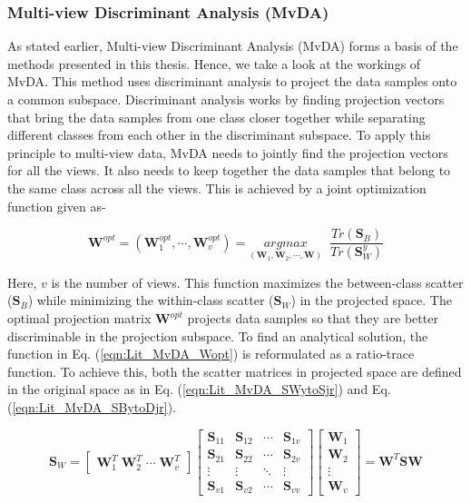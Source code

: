 \subsubsection{Multi-view Discriminant Analysis (MvDA)}
\label{ssubs:Lit_MvDA}
As stated earlier, Multi-view Discriminant Analysis (MvDA) \cite{KanSZLC16} forms a basis of the methods presented in this thesis. Hence, we take a look at the workings of MvDA. This method uses discriminant analysis to project the data samples onto a common subspace. Discriminant analysis works by finding projection vectors that bring the data samples from one class closer together while separating different classes from each other in the discriminant subspace. To apply this principle to multi-view data, MvDA needs to jointly find the projection vectors for all the views. It also needs to keep together the data samples that belong to the same class across all the views. This is achieved by a joint optimization function given as-

\begin{equation}
\label{eqn:Lit_MvDA_Wopt}
\textbf{W}^{opt} = \left ( \textbf{W}_1^{opt},\cdots,\textbf{W}_v^{opt} \right ) = \underset{\left ( \textbf{W}_1, \textbf{W}_2,\cdots,\textbf{W} \right )}{argmax}\;\;\frac{Tr\left ( \textbf{S}_B \right )}{Tr\left (\textbf{S}_W^y \right )}
\end{equation}

Here, $v$ is the number of views. This function maximizes the between-class scatter ($\textbf{S}_B$) while minimizing the within-class scatter ($\textbf{S}_W$) in the projected space. The optimal projection matrix $\textbf{W}^{opt}$ projects data samples so that they are better discriminable in the projection subspace. To find an analytical solution, the function in Eq. (\ref{eqn:Lit_MvDA_Wopt}) is reformulated as a ratio-trace function. To achieve this, both the scatter matrices in projected space are defined in the original space as in Eq. (\ref{eqn:Lit_MvDA_SWytoSjr}) and Eq. (\ref{eqn:Lit_MvDA_SBytoDjr}).

\begin{equation}
\label{eqn:Lit_MvDA_SWytoSjr}
\textbf{S}_W = \begin{bmatrix}
\textbf{W}_1^T \; \textbf{W}_2^T \; \cdots \; \textbf{W}_v^T
\end{bmatrix} 
\begin{bmatrix}
\textbf{S}_{11} & \textbf{S}_{12} & \cdots & \textbf{S}_{1v}\\ 
\textbf{S}_{21} & \textbf{S}_{22} & \cdots & \textbf{S}_{2v}\\
\vdots & \vdots & \ddots & \vdots\\ 
\textbf{S}_{v1} & \textbf{S}_{v2} & \cdots & \textbf{S}_{vv} 
\end{bmatrix}
\begin{bmatrix}
\textbf{W}_1\\ 
\textbf{W}_2\\ 
\vdots\\ 
\textbf{W}_v
\end{bmatrix} 
= \textbf{W}^T \textbf{S} \textbf{W}
\end{equation}

